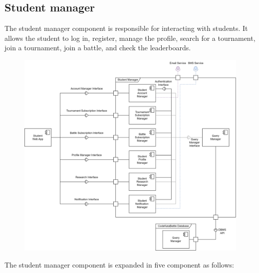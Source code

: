 \documentclass[12pt, a4paper]{report}
\begin{document}
    \subsection{Student manager}
    The student manager component is responsible for interacting with students.
    It allows the student to log in, register, manage the profile, search for a tournament, join a tournament, join a battle, and check the leaderboards.  
    \begin{figure}[H]
        \centering
        \includegraphics[width=0.8\linewidth]{images/component_view_student.png}
    \end{figure}
    The student manager component is expanded in five component as follows: 
\end{document}
